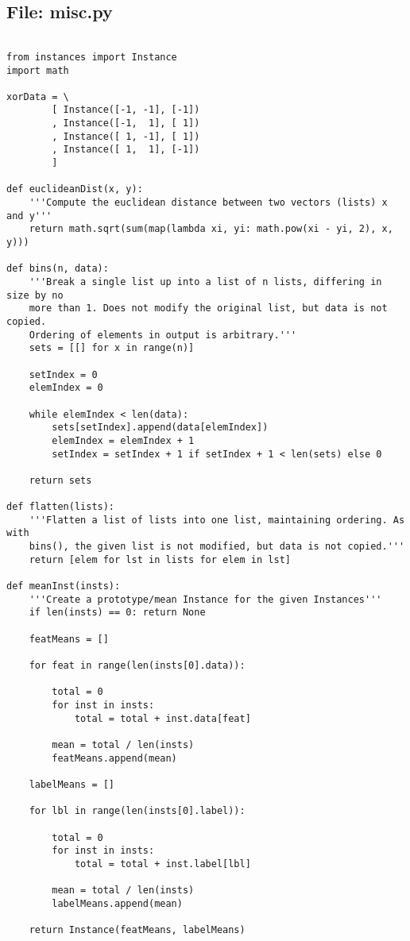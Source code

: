 \documentclass{article}
\begin{document}
\subsection*{File: misc.py}
\begin{verbatim}

from instances import Instance
import math

xorData = \
        [ Instance([-1, -1], [-1])
        , Instance([-1,  1], [ 1])
        , Instance([ 1, -1], [ 1])
        , Instance([ 1,  1], [-1])
        ]

def euclideanDist(x, y):
    '''Compute the euclidean distance between two vectors (lists) x and y'''
    return math.sqrt(sum(map(lambda xi, yi: math.pow(xi - yi, 2), x, y)))

def bins(n, data):
    '''Break a single list up into a list of n lists, differing in size by no
    more than 1. Does not modify the original list, but data is not copied.
    Ordering of elements in output is arbitrary.'''
    sets = [[] for x in range(n)]

    setIndex = 0
    elemIndex = 0

    while elemIndex < len(data):
        sets[setIndex].append(data[elemIndex])
        elemIndex = elemIndex + 1
        setIndex = setIndex + 1 if setIndex + 1 < len(sets) else 0

    return sets

def flatten(lists):
    '''Flatten a list of lists into one list, maintaining ordering. As with
    bins(), the given list is not modified, but data is not copied.'''
    return [elem for lst in lists for elem in lst]

def meanInst(insts):
    '''Create a prototype/mean Instance for the given Instances'''
    if len(insts) == 0: return None

    featMeans = []

    for feat in range(len(insts[0].data)):

        total = 0
        for inst in insts:
            total = total + inst.data[feat]

        mean = total / len(insts)
        featMeans.append(mean)

    labelMeans = []    

    for lbl in range(len(insts[0].label)):

        total = 0
        for inst in insts:
            total = total + inst.label[lbl]

        mean = total / len(insts)
        labelMeans.append(mean)
    
    return Instance(featMeans, labelMeans)

\end{verbatim}
\end{document}
